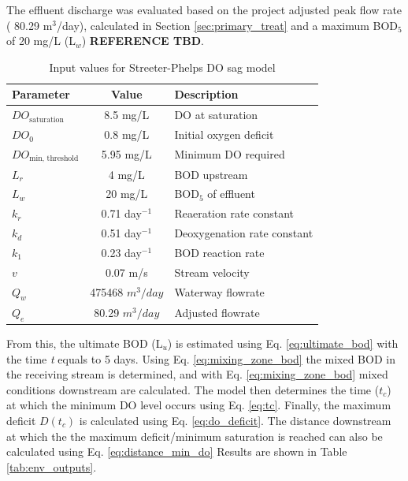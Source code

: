 \documentclass[12pt]{article}
\begin{document}
The effluent discharge was evaluated based on the project adjusted 
peak flow rate (
80.29
m$^3$/day), calculated in Section \ref{sec:primary_treat} and a maximum BOD$_5$ of 20 mg/L (L$_w$) 
\textbf{REFERENCE TBD}. 

\begin{table}[h]
  \centering
  \caption{Input values for Streeter-Phelps DO sag model}
  \label{tab:env_inputs}
  \begin{tabular}{|l|c|l|}
  \hline
  \textbf{Parameter} & \textbf{Value} & \textbf{Description} \\
  \hline
  $DO_{\text{saturation}}$ & 8.5 mg/L & DO at saturation \\
  $DO_0$ & 0.8 mg/L & Initial oxygen deficit \\
  $DO_{\text{min, threshold}}$ & 5.95 mg/L & Minimum DO required \\
  $L_r$ & 4 mg/L & BOD upstream \\
  $L_w$ & 20 mg/L & BOD$_5$ of effluent \\
  $k_r$ & 0.71 day$^{-1}$ & Reaeration rate constant \\
  $k_d$ & 0.51 day$^{-1}$ & Deoxygenation rate constant \\
  $k_1$ & 0.23 day$^{-1}$ & BOD reaction rate \\
  $v$ & 0.07 m/s & Stream velocity \\
  $Q_w$ & 475468 $m^3/day$ & Waterway flowrate\\
  $Q_e$ &
80.29
  $m^3/day$ & Adjusted flowrate\\
  \hline
  \end{tabular}
\end{table}


From this, the ultimate BOD (L$_u$) is estimated using Eq. \eqref{eq:ultimate_bod} with the time \textit{t} 
equals to 5 days. Using Eq. \eqref{eq:mixing_zone_bod} the mixed BOD in the receiving stream is
determined, and with Eq. \eqref{eq:mixing_zone_bod} mixed conditions downstream are calculated.
The model then determines the time ($t_c$) at which the minimum DO level occurs using Eq. \eqref{eq:tc}. 
Finally, the maximum deficit $D(t_c)$ is calculated using Eq. \eqref{eq:do_deficit}.
The distance downstream at which the the maximum deficit/minimum saturation 
is reached can also be calculated using Eq. \eqref{eq:distance_min_do} Results are 
shown in Table \ref{tab:env_outputs}.
\end{document}
